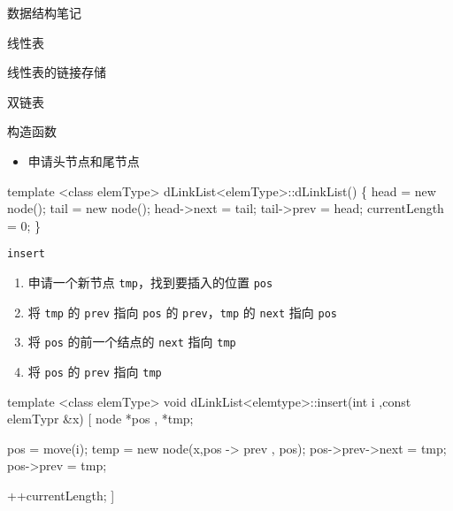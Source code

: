 \documentclass[
  ignorenonframetext,
]{beamer}
\newenvironment{Shaded}{}{}
\newcommand{\NormalTok}[1]{#1}
\providecommand{\tightlist}{%
  \setlength{\itemsep}{0pt}\setlength{\parskip}{0pt}}
\begin{document}
\begin{frame}[fragile]{数据结构笔记}
\begin{block}{线性表}
\begin{block}{线性表的链接存储}
\begin{block}{双链表}
\begin{block}{构造函数}
\protect{}\label{ux6784ux9020ux51fdux6570-2}
\begin{itemize}
\tightlist
\item
  申请头节点和尾节点
\end{itemize}


\begin{Shaded}
\begin{Highlighting}[]
\NormalTok{template \textless{}class elemType\textgreater{}}
\NormalTok{dLinkList\textless{}elemType\textgreater{}::dLinkList()}
\NormalTok{\{}
\NormalTok{  head = new node();}
\NormalTok{  tail = new node();}
\NormalTok{  head{-}\textgreater{}next = tail;}
\NormalTok{  tail{-}\textgreater{}prev = head;}
\NormalTok{  currentLength = 0;}
\NormalTok{\}}
\end{Highlighting}
\end{Shaded}
\end{block}

\begin{block}{\texttt{insert}}
\protect{}\label{insert-2}
\begin{enumerate}
\tightlist
\item
  申请一个新节点 \texttt{tmp}，找到要插入的位置 \texttt{pos}
\item
  将 \texttt{tmp} 的 \texttt{prev} 指向 \texttt{pos} 的
  \texttt{prev}，\texttt{tmp} 的 \texttt{next} 指向 \texttt{pos}
\item
  将 \texttt{pos} 的前一个结点的 \texttt{next} 指向 \texttt{tmp}
\item
  将 \texttt{pos} 的 \texttt{prev} 指向 \texttt{tmp}
\end{enumerate}


\begin{Shaded}
\begin{Highlighting}[]
\NormalTok{template \textless{}class elemType\textgreater{}}
\NormalTok{void dLinkList\textless{}elemtype\textgreater{}::insert(int i ,const elemTypr \&x)}
\NormalTok{[}
\NormalTok{  node *pos , *tmp;}

\NormalTok{  pos = move(i);}
\NormalTok{  temp = new node(x,pos {-}\textgreater{} prev , pos);}
\NormalTok{  pos{-}\textgreater{}prev{-}\textgreater{}next = tmp;}
\NormalTok{  pos{-}\textgreater{}prev = tmp;}

\NormalTok{  ++currentLength;}
\NormalTok{]}
\end{Highlighting}
\end{Shaded}
\end{block}


\end{block}
\end{block}
\end{block}
\end{frame}
\end{document}
